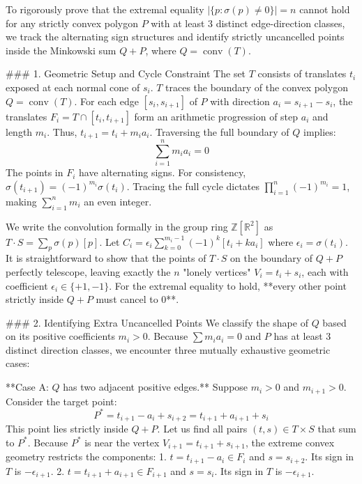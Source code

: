 To rigorously prove that the extremal equality $|\{p : \sigma(p) \ne 0\}| = n$ cannot hold for any strictly convex polygon $P$ with at least 3 distinct edge-direction classes, we track the alternating sign structures and identify strictly uncancelled points inside the Minkowski sum $Q+P$, where $Q = \operatorname{conv}(T)$.

### 1. Geometric Setup and Cycle Constraint
The set $T$ consists of translates $t_i$ exposed at each normal cone of $s_i$. $T$ traces the boundary of the convex polygon $Q = \operatorname{conv}(T)$. 
For each edge $[s_i, s_{i+1}]$ of $P$ with direction $a_i = s_{i+1} - s_i$, the translates $F_i = T \cap [t_i, t_{i+1}]$ form an arithmetic progression of step $a_i$ and length $m_i$. Thus, $t_{i+1} = t_i + m_i a_i$. 
Traversing the full boundary of $Q$ implies:
$$ \sum_{i=1}^n m_i a_i = 0 $$
The points in $F_i$ have alternating signs. For consistency, $\sigma(t_{i+1}) = (-1)^{m_i} \sigma(t_i)$. Tracing the full cycle dictates $\prod_{i=1}^n (-1)^{m_i} = 1$, making $\sum_{i=1}^n m_i$ an even integer. 

We write the convolution formally in the group ring $\mathbb{Z}[\mathbb{R}^2]$ as $T \cdot S = \sum_{p} \sigma(p) [p]$.
Let $C_i = \epsilon_i \sum_{k=0}^{m_i-1} (-1)^k[t_i + k a_i]$ where $\epsilon_i = \sigma(t_i)$. It is straightforward to show that the points of $T \cdot S$ on the boundary of $Q+P$ perfectly telescope, leaving exactly the $n$ "lonely vertices" $V_i = t_i + s_i$, each with coefficient $\epsilon_i \in \{+1, -1\}$.
For the extremal equality to hold, **every other point strictly inside $Q+P$ must cancel to $0$**.

### 2. Identifying Extra Uncancelled Points
We classify the shape of $Q$ based on its positive coefficients $m_i > 0$. Because $\sum m_i a_i = 0$ and $P$ has at least 3 distinct direction classes, we encounter three mutually exhaustive geometric cases:

**Case A: $Q$ has two adjacent positive edges.**
Suppose $m_i > 0$ and $m_{i+1} > 0$. Consider the target point:
$$ P^* = t_{i+1} - a_i + s_{i+2} = t_{i+1} + a_{i+1} + s_i $$
This point lies strictly inside $Q+P$. Let us find all pairs $(t,s) \in T \times S$ that sum to $P^*$.
Because $P^*$ is near the vertex $V_{i+1} = t_{i+1} + s_{i+1}$, the extreme convex geometry restricts the components:
1. $t = t_{i+1} - a_i \in F_i$ and $s = s_{i+2}$. Its sign in $T$ is $-\epsilon_{i+1}$.
2. $t = t_{i+1} + a_{i+1} \in F_{i+1}$ and $s = s_i$. Its sign in $T$ is $-\epsilon_{i+1}$.

